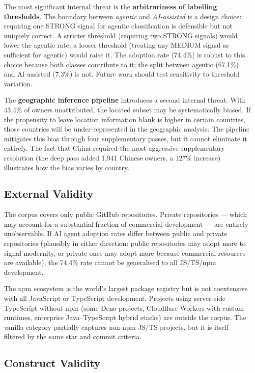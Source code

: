 The most significant internal threat is the \textbf{arbitrariness of labelling thresholds}. The boundary between \emph{agentic} and \emph{AI-assisted} is a design choice: requiring one STRONG signal for agentic classification is defensible but not uniquely correct. A stricter threshold (requiring two STRONG signals) would lower the agentic rate; a looser threshold (treating any MEDIUM signal as sufficient for agentic) would raise it. The adoption rate (74.4\%) is robust to this choice because both classes contribute to it; the split between agentic (67.1\%) and AI-assisted (7.3\%) is not. Future work should test sensitivity to threshold variation.

The \textbf{geographic inference pipeline} introduces a second internal threat. With 43.4\% of owners unattributed, the located subset may be systematically biased. If the propensity to leave location information blank is higher in certain countries, those countries will be under-represented in the geographic analysis. The pipeline mitigates this bias through four supplementary passes, but it cannot eliminate it entirely. The fact that China required the most aggressive supplementary resolution (the deep pass added 1,941 Chinese owners, a 127\% increase) illustrates how the bias varies by country.

\subsection{External Validity}

The corpus covers only public GitHub repositories. Private repositories --- which may account for a substantial fraction of commercial development --- are entirely unobservable. If AI agent adoption rates differ between public and private repositories (plausibly in either direction: public repositories may adopt more to signal modernity, or private ones may adopt more because commercial resources are available), the 74.4\% rate cannot be generalised to all JS/TS/npm development.

The npm ecosystem is the world's largest package registry but is not coextensive with all JavaScript or TypeScript development. Projects using server-side TypeScript without npm (some Deno projects, Cloudflare Workers with custom runtimes, enterprise Java--TypeScript hybrid stacks) are outside the corpus. The vanilla category partially captures non-npm JS/TS projects, but it is itself filtered by the same star and commit criteria.

\subsection{Construct Validity}


